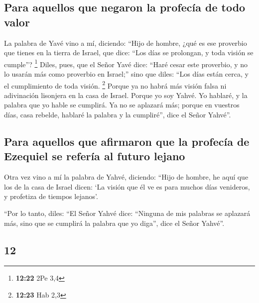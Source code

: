 \begin{paracol}{2}
\hypertarget{para-aquellos-que-negaron-la-profecuxeda-de-todo-valor}{%
\subsection{Para aquellos que negaron la profecía de todo
valor}\label{para-aquellos-que-negaron-la-profecuxeda-de-todo-valor}}

 La palabra de Yavé vino a mí, diciendo: 
``Hijo de hombre, ¿qué es ese proverbio que tienes en la tierra de
Israel, que dice: ``Los días se prolongan, y toda visión se cumple''?
\footnote{\textbf{12:22} 2Pe 3,4}  Diles, pues, que el
Señor Yavé dice: ``Haré cesar este proverbio, y no lo usarán más como
proverbio en Israel;'' sino que diles: ``Los días están cerca, y el
cumplimiento de toda visión. \footnote{\textbf{12:23} Hab 2,3}
 Porque ya no habrá más visión falsa ni adivinación
lisonjera en la casa de Israel.  Porque yo soy Yahvé. Yo
hablaré, y la palabra que yo hable se cumplirá. Ya no se aplazará más;
porque en vuestros días, casa rebelde, hablaré la palabra y la
cumpliré'', dice el Señor Yahvé''.

\hypertarget{para-aquellos-que-afirmaron-que-la-profecuxeda-de-ezequiel-se-referuxeda-al-futuro-lejano}{%
\subsection{Para aquellos que afirmaron que la profecía de Ezequiel se
refería al futuro
lejano}\label{para-aquellos-que-afirmaron-que-la-profecuxeda-de-ezequiel-se-referuxeda-al-futuro-lejano}}

 Otra vez vino a mí la palabra de Yahvé, diciendo:
 ``Hijo de hombre, he aquí que los de la casa de Israel
dicen: `La visión que él ve es para muchos días venideros, y profetiza
de tiempos lejanos'.

 ``Por lo tanto, diles: ``El Señor Yahvé dice: ``Ninguna
de mis palabras se aplazará más, sino que se cumplirá la palabra que yo
diga'', dice el Señor Yahvé''.

\switchcolumn
\begin{otherlanguage}{english}

\hypertarget{section-23}{%
\section{12}\label{section-23}}


\end{otherlanguage}
\end{paracol}
